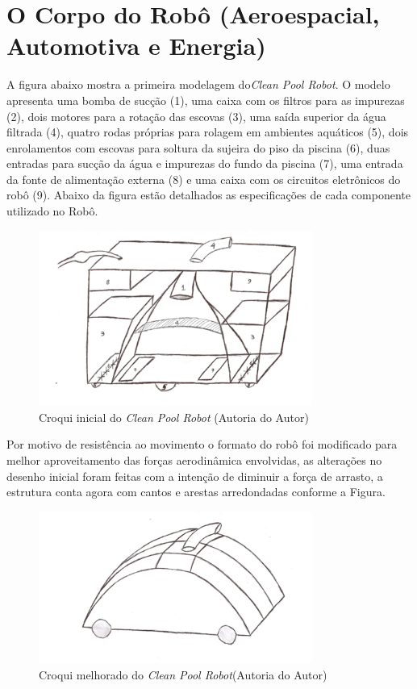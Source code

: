 \section{O Corpo do Robô (Aeroespacial, Automotiva e Energia)}
A figura abaixo mostra a primeira modelagem do\textit{Clean Pool Robot}. O modelo
apresenta uma bomba de sucção (1), uma caixa com os filtros para as impurezas
(2), dois motores para a rotação das escovas (3), uma saída superior da água
filtrada (4), quatro rodas próprias para rolagem em ambientes aquáticos (5),
dois enrolamentos com escovas para soltura da sujeira do piso da piscina (6),
duas entradas para sucção da água e impurezas do fundo da piscina (7), uma
entrada da fonte de alimentação externa (8) e uma caixa com os circuitos
eletrônicos do robô (9). Abaixo da figura estão detalhados as especificações
de cada componente utilizado no Robô.
\par
\begin{figure}[h]
  \centering
  \includegraphics[width=0.8\textwidth]{figures/croqui.png}
  \caption{ Croqui inicial do \textit{Clean Pool Robot} (\textsf{Autoria do Autor})}
  \label{fig:initial_croqui}
\end{figure}
\FloatBarrier
\par
Por motivo de resistência ao movimento o formato do robô foi modificado para
melhor aproveitamento das forças aerodinâmica envolvidas, as alterações no
desenho inicial foram feitas com a intenção de diminuir a força de arrasto, a
estrutura conta agora com cantos e arestas arredondadas conforme a Figura.
\par
\begin{figure}[h]
  \centering
  \includegraphics[width=0.8\textwidth]{figures/better-croqui.png}
  \caption{ Croqui melhorado do \textit{Clean Pool Robot}(\textsf{Autoria do Autor})}
  \label{fig:better-croqui}
\end{figure}

